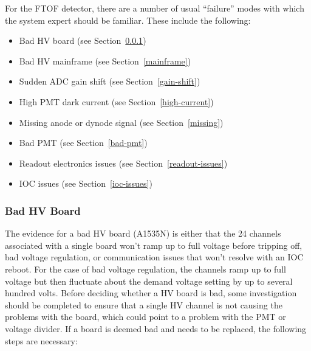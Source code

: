 \documentclass[12pt]{article}
\begin{document}
For the FTOF detector, there are a number of usual ``failure'' modes with which the 
system expert should be familiar. These include the following:

\begin{itemize}
\item Bad HV board (see Section~\ref{board-swap})
\item Bad HV mainframe (see Section~\ref{mainframe})
\item Sudden ADC gain shift (see Section~\ref{gain-shift})
\item High PMT dark current (see Section~\ref{high-current})
\item Missing anode or dynode signal (see Section~\ref{missing})
\item Bad PMT (see Section~\ref{bad-pmt})
\item Readout electronics issues (see Section~\ref{readout-issues})
\item IOC issues (see Section~\ref{ioc-issues})
\end{itemize}

\subsubsection{Bad HV Board}
\label{board-swap}

The evidence for a bad HV board (A1535N) is either that the 24 channels associated 
with a single board won't ramp up to full voltage before tripping off, bad voltage 
regulation, or communication issues that won't resolve with an IOC reboot. For the 
case of bad voltage regulation, the channels ramp up to full voltage but then fluctuate 
about the demand voltage setting by up to several hundred volts. Before deciding whether 
a HV board is bad, some investigation should be completed to ensure that a single HV 
channel is not causing the problems with the board, which could point to a problem with 
the PMT or voltage divider. If a board is deemed bad and needs to be replaced, the 
following steps are necessary:
\end{document}
